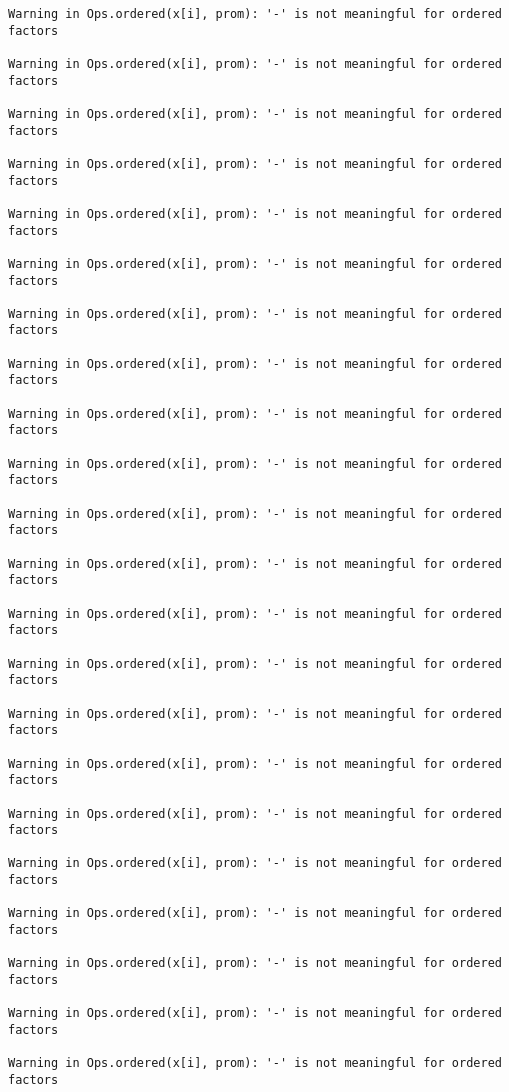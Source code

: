 \documentclass[]{article}
\begin{document}
\begin{verbatim}
Warning in Ops.ordered(x[i], prom): '-' is not meaningful for ordered
factors

Warning in Ops.ordered(x[i], prom): '-' is not meaningful for ordered
factors

Warning in Ops.ordered(x[i], prom): '-' is not meaningful for ordered
factors

Warning in Ops.ordered(x[i], prom): '-' is not meaningful for ordered
factors

Warning in Ops.ordered(x[i], prom): '-' is not meaningful for ordered
factors

Warning in Ops.ordered(x[i], prom): '-' is not meaningful for ordered
factors

Warning in Ops.ordered(x[i], prom): '-' is not meaningful for ordered
factors

Warning in Ops.ordered(x[i], prom): '-' is not meaningful for ordered
factors

Warning in Ops.ordered(x[i], prom): '-' is not meaningful for ordered
factors

Warning in Ops.ordered(x[i], prom): '-' is not meaningful for ordered
factors

Warning in Ops.ordered(x[i], prom): '-' is not meaningful for ordered
factors

Warning in Ops.ordered(x[i], prom): '-' is not meaningful for ordered
factors

Warning in Ops.ordered(x[i], prom): '-' is not meaningful for ordered
factors

Warning in Ops.ordered(x[i], prom): '-' is not meaningful for ordered
factors

Warning in Ops.ordered(x[i], prom): '-' is not meaningful for ordered
factors

Warning in Ops.ordered(x[i], prom): '-' is not meaningful for ordered
factors

Warning in Ops.ordered(x[i], prom): '-' is not meaningful for ordered
factors

Warning in Ops.ordered(x[i], prom): '-' is not meaningful for ordered
factors

Warning in Ops.ordered(x[i], prom): '-' is not meaningful for ordered
factors

Warning in Ops.ordered(x[i], prom): '-' is not meaningful for ordered
factors

Warning in Ops.ordered(x[i], prom): '-' is not meaningful for ordered
factors

Warning in Ops.ordered(x[i], prom): '-' is not meaningful for ordered
factors
\end{verbatim}
\end{document}
